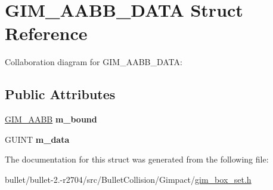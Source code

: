 \hypertarget{struct_g_i_m___a_a_b_b___d_a_t_a}{\section{G\+I\+M\+\_\+\+A\+A\+B\+B\+\_\+\+D\+A\+T\+A Struct Reference}
\label{struct_g_i_m___a_a_b_b___d_a_t_a}
}


Collaboration diagram for G\+I\+M\+\_\+\+A\+A\+B\+B\+\_\+\+D\+A\+T\+A\+:
\subsection*{Public Attributes}
\begin{DoxyCompactItemize}
\item 
\hypertarget{struct_g_i_m___a_a_b_b___d_a_t_a_a0bcb619d705ecdc4c6d663ca7dee3755}{\hyperlink{class_g_i_m___a_a_b_b}{G\+I\+M\+\_\+\+A\+A\+B\+B} {\bfseries m\+\_\+bound}}\label{struct_g_i_m___a_a_b_b___d_a_t_a_a0bcb619d705ecdc4c6d663ca7dee3755}

\item 
\hypertarget{struct_g_i_m___a_a_b_b___d_a_t_a_ab78bc93dfa158b5fc01a6a1d4d1bfd0a}{G\+U\+I\+N\+T {\bfseries m\+\_\+data}}\label{struct_g_i_m___a_a_b_b___d_a_t_a_ab78bc93dfa158b5fc01a6a1d4d1bfd0a}

\end{DoxyCompactItemize}


The documentation for this struct was generated from the following file\+:\begin{DoxyCompactItemize}
\item 
bullet/bullet-\/2.-\/r2704/src/\+Bullet\+Collision/\+Gimpact/\hyperlink{gim__box__set_8h}{gim\+\_\+box\+\_\+set.\+h}\end{DoxyCompactItemize}
